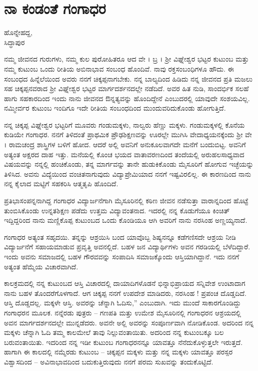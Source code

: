 \chapter{ನಾ ಕಂಡಂತೆ ಗಂಗಾಧರ}

\begin{center}
\smallskip

ಹೊನ್ನೇಹದ್ದ,\\ 
ಸಿದ್ಧಾಪುರ
\addrule
\end{center}

ನಮ್ಮ ಜೀವನದ ಗುರುಗಳು, ನಮ್ಮ ಕುಲ ಪುರೋಹಿತರೂ ಆದ ವೇ । ಬ್ರ । ಶ್ರೀ ವಿಘ್ನೇಶ್ವರ ಭಟ್ಟರ ಕುಟುಂಬ ಮತ್ತು ನಮ್ಮ ಕುಟುಂಬ ಒಂದು ರೀತಿಯ ಅಬಿನಾಭಾವ ಸಂಬಂಧ ಹೊಂದಿವೆ. ನಾವು ರಕ್ತಸಂಬಂಧಿಗಳೂ ಹೌದು. ಈ ಸಂಬಂಧದ ಹಿನ್ನೆಲೆಯಿಂದ ಅವರು ನನಗೆ ಚಿಕ್ಕಪ್ಪನಾಗಬೇಕು. ನನ್ನ ಬಾಲ್ಯದಿಂದ ಹಿಡಿದು ನನ್ನ ಜೀವನದ ಪ್ರತಿ ಮಜಲು ಸಹ ಚಿಕ್ಕಪ್ಪನವರಾದ ಶ್ರೀ ವಿಘ್ನೇಶ್ವರ ಭಟ್ಟರ ಮಾರ್ಗದರ್ಶನದಲ್ಲೇ ನಡೆದಿದೆ. ಅವರ ಹಿತ ನುಡಿ, ಸಾಂದರ್ಭಿಕ ಸಲಹೆ ಹಾಗು ಸಹಕಾರದಿಂದ ಇಂದು ನಾನು ಜೀವನದ ಔನ್ನತ್ಯವನ್ನು ಹೊಂದಿದ್ದೇನೆ ಎಂಬುದರಲ್ಲಿ ಯಾವುದೇ ಸಂಶಯವಿಲ್ಲ. ನಮ್ಮೀರ್ವರ ಕುಟುಂಬ ಇಂದಿಗೂ ಇದೇ ರೀತಿಯ ಸಂಬಂಧದಿಂದ ಮುಂದುವರಿದುಕೊಂಡು ಹೋಗುತ್ತಿದೆ.

ನನ್ನ ಚಿಕ್ಕಪ್ಪ ವಿಘ್ನೇಶ್ವರ ಭಟ್ಟರಿಗೆ ಮೂವರು ಗಂಡುಮಕ್ಕಳು, ನಾಲ್ವರು ಹೆಣ್ಣು ಮಕ್ಕಳು. ಗಂಡುಮಕ್ಕಳಲ್ಲಿ ಕೊನೆಯ ಕುಡಿಯೇ ಗಂಗಾಧರ. ನನಗೆ ತಿಳಿದಂತೆ ಪ್ರಾಥಮಿಕ ಪ್ರೌಢಶಿಕ್ಷಣವನ್ನು ಊರಲ್ಲೇ ಮುಗಿಸಿ ವೇದಾಧ್ಯಯನಕ್ಕೆಂದು ಶ್ರೀ ವೇ । ರಾಮಚಂದ್ರ ಶಾಸ್ತ್ರಿಗಳ ಬಳಿಗೆ ಹೋದ. ಆದರೆ ಅಲ್ಲಿ ಅವನಿಗೆ ಅನುಕೂಲವಾಗದೇ ಮನೆಗೆ ಬಂದುಬಿಟ್ಟ. ಅವನಿಗೆ ಅತ್ಯಂತ ಅಕ್ಷರದ ದಾಹ ಇತ್ತು. ಮನೆಯಲ್ಲಿ ಕೊಂಚ ಭಯದ ವಾತಾವರಣದಿಂದ ತಂದೆಯಲ್ಲಿ ಅರುಹಲಸಾಧ್ಯವಾದ ವಿಷಯವನ್ನು ನನ್ನಲ್ಲಿ ಹಂಚಿಕೊಂಡು, ತನ್ನ ಮಾರ್ಗವನ್ನು ತಾನೇ ಹುಡುಕಿಕೊಂಡು ಮೈಸೂರಿಗೆ ಹೋಗುವ ಇಚ್ಛೆಯನ್ನು ತಿಳಿಸಿದ. ಅವನು ವಿದ್ಯೆಯಿಂದ ವಂಚಿತನಾಗುವುದು ವಿದ್ಯಾಪ್ರೇಮಿಯಾದ ನನಗೆ ಇಷ್ಟವಿರಲಿಲ್ಲ.  ಈ ಕಾರಣದಿಂದ ನಾನು ನನ್ನ ಕೈಲಾದ ಮಟ್ಟಿಗೆ ಸಹಕರಿಸಿ  ಆತ್ಮತೃಪಿ ಹೊಂದಿದೆ.

ಪ್ರತಿಭಾಸಂಪನ್ನನಾಗಿದ್ದ ಗಂಗಾಧರ ವಿದ್ಯಾರ್ಜನೆಗಾಗಿ ಮೈಸೂರಿನಲ್ಲಿ ಕಠಿಣ ಜೀವನ ನಡೆಸುತ್ತಾ ವಾರಾನ್ನದಿಂದ ಹೊಟ್ಟೆ ತುಂಬಿಸಿಕೊಂಡು  ಉನ್ನತಶಿಕ್ಷಣ ಪಡೆದು ಉತ್ತಮ ವಿದ್ಯಾವಂತನಾದ. ಇದರಲ್ಲಿ ನನ್ನ ಕೊಡುಗೆಯೂ ಕಿಂಚಿತ್ ಇದ್ದಿದ್ದರಿಂದ ನಾನು ಮಣ್ಣಿಕೊಪ್ಪ ಕುಟುಂಬದ ಒಂದು ಕೊಂಡಿಯೂ ಆಗಿ ಅವರಿಗೆ ನಾನು ನರಸಿಂಹ ಅಣ್ಣಯ್ಯನಾದೆ. 

ಗಂಗಾಧರ ಅತ್ಯಂತ ಸಹೃದಯಿ. ತನ್ನನ್ನು ಆಶ್ರಯಿಸಿ ಬಂದ ಯಾವೊಬ್ಬ ಶಿಷ್ಯನನ್ನೂ ಕಡೆಗಣಿಸದೇ ಆಶ್ರಯ ನೀಡಿ ವಿದ್ಯಾರ್ಜನೆಗೆ ಸಹಾಯಮಾಡುವ ಪ್ರವೃತ್ತಿ ಅವನಲ್ಲಿದೆ. ಬಹಳ ಜನ ವಿದ್ಯಾರ್ಥಿಗಳು ಅವನ ಗರಡಿಯಲ್ಲಿ ಬೆಳೆದಿದ್ದಾರೆ. ಇಂದು ಅವನು ಸಮಾಜದಲ್ಲಿ ಬಹಳ ಗೌರವವನ್ನು ಸಂಪಾದಿಸಿ ಸಮಾಜಕ್ಕೊಂದು ಆಸ್ತಿಯಾಗಿದ್ದಾನೆ. ಇದು ನನಗೆ ಅತ್ಯಂತ ಹೆಮ್ಮೆಯ ವಿಚಾರವಾಗಿದೆ.

ಕಾಲಕ್ರಮದಲ್ಲಿ ನನ್ನ ಕುಟುಂಬದ ಆಸ್ತಿ ವಿಚಾರದಲ್ಲಿ ದಾಯಾದಿಗಳೊಡನೆ ಭಿನ್ನಾಭಿಪ್ರಾಯದ ಸನ್ನಿವೇಶ ಉಂಟಾದಾಗ ನಾನು ಬಹಳ ತೊಂದರೆಗೊಳಗಾದೆ. ಆಗ ಚಿಕ್ಕಪ್ಪ ನನಗೆ ಉಪದೇಶ ಮಾಡಿದರು, ನರಸಿಂಹ ! ಪ್ರಪಂಚ ದೊಡ್ಡದಿದೆ. ಆಸ್ತಿ ದೊಡ್ಡದಲ್ಲ. ಮಕ್ಕಳೇ ಆಸ್ತಿ. ಅವರನ್ನು ಚೆನ್ನಾಗಿ ಓದಿಸು,” ಎಂಬುದಾಗಿ. ಇದು ಮುಂದೆ ಸಾಕಾರಗೊಂಡಿದ್ದು ಗಂಗಾಧರನ ಮೂಲಕ. ನನ್ನೆರಡು ಪುತ್ರರು – ಗಣಪತಿ ಮತ್ತು ಉಮೇಶ ಮೈಸೂರಿನಲ್ಲಿ ಗಂಗಾಧರನ ಆಶ್ರಯದಲ್ಲಿ ಅವನ ಮಾರ್ಗದರ್ಶನದಲ್ಲೇ ಮುನ್ನಡೆದರು. ಅವನೇ ಅಲ್ಲಿ ಅವರನ್ನು ಸಂಪೂರ್ಣವಾಗಿ ನೋಡಿಕೊಂಡ. ಅದರಿಂದ ನನ್ನ ಮಕ್ಕಳು ಚೆನ್ನಾಗಿ ಓದಿ ತಮ್ಮ ಕಾಲಮೇಲೆ ತಾವು ನಿಲ್ಲುವಂತಾಯಿತು.  ಅದರಿಂದ ನನ್ನ ಕುಟುಂಬಕ್ಕೂ  ಬಲ ಬರುವಂತಾಯಿತು. ಇದರಿಂದ ನನ್ನ ಇಡೀ ಕುಟುಂಬ ಗಂಗಾಧರನನ್ನೂ ಯಾವತ್ತೂ ನೆನೆದುಕೊಳ್ಳುತ್ತಲೇ ಇರುತ್ತದೆ. ಹಾಗಾಗಿ ಈ ಕಾಲದಲ್ಲಿ ನಮ್ಮೆರಡು ಕುಟುಂಬ – ಚಿಕ್ಕಪ್ಪನ ಮಕ್ಕಳು ಮತ್ತು ನನ್ನ ಮಕ್ಕಳು ಯಾವತ್ತೂ ಪರಸ್ಪರ ವಿಶ್ವಾಸದಿಂದ – ಅವಿನಾಭಾವದಿಂದ ಬದುಕುತ್ತಿರುವುದು ನನಗೆ ಪರಮ ಸುಖವನ್ನು ತಂದುಕೊಟ್ಟಿದೆ. 

